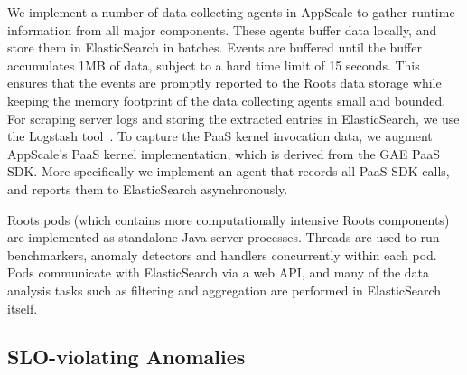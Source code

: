 We implement a number of data collecting agents in AppScale to gather runtime information
from all major components. These agents buffer data locally, and store them in ElasticSearch
in batches. Events are buffered until the buffer accumulates 1MB of data, subject to a hard time limit of 
15 seconds. This ensures that the events are promptly reported to the Roots data
storage while keeping the memory footprint of the data collecting agents small and bounded. 
For scraping server logs and storing the extracted entries in ElasticSearch,
we use the Logstash tool~\cite{logstash}. 
To capture the PaaS kernel invocation data, we augment AppScale's PaaS kernel implementation,
which is derived from the GAE PaaS SDK. More specifically we implement an agent that records
all PaaS SDK calls, and reports them to ElasticSearch asynchronously. 

Roots pods (which  contains more computationally intensive Roots components) are implemented 
as standalone Java server processes. Threads are used to run benchmarkers,
anomaly detectors and handlers concurrently within each pod. Pods communicate with ElasticSearch via
a web API, and many of the data analysis tasks such as filtering and aggregation are performed
in ElasticSearch itself. 

\subsection{SLO-violating Anomalies}

